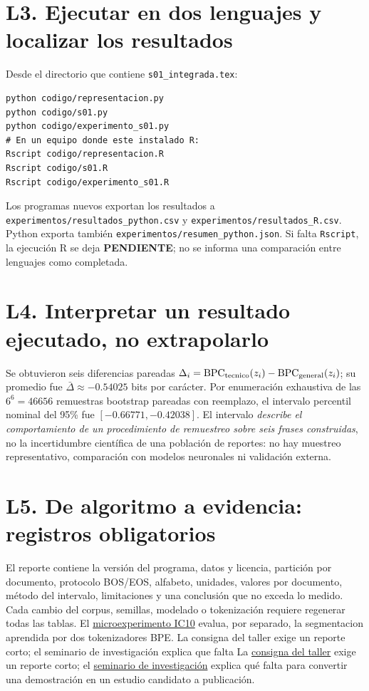 \section*{L3. Ejecutar en dos lenguajes y localizar los resultados}
Desde el directorio que contiene \texttt{s01\_integrada.tex}:
\begin{verbatim}
python codigo/representacion.py
python codigo/s01.py
python codigo/experimento_s01.py
# En un equipo donde este instalado R:
Rscript codigo/representacion.R
Rscript codigo/s01.R
Rscript codigo/experimento_s01.R
\end{verbatim}
Los programas nuevos exportan los resultados a
\nolinkurl{experimentos/resultados_python.csv} y
\nolinkurl{experimentos/resultados_R.csv}. Python exporta también
\nolinkurl{experimentos/resumen_python.json}. Si falta \texttt{Rscript},
la ejecución R se deja \textbf{PENDIENTE}; no se informa una comparación
entre lenguajes como completada.

\section*{L4. Interpretar un resultado ejecutado, no extrapolarlo}
\begin{ejemplo}
Se obtuvieron seis diferencias pareadas
$\Delta_i=\operatorname{BPC}_{\rm tecnico}(z_i)-
\operatorname{BPC}_{\rm general}(z_i)$; su promedio fue
$\bar\Delta\approx-0.54025$ bits por carácter.
Por enumeración exhaustiva de las $6^6=46656$ remuestras bootstrap
pareadas con reemplazo, el intervalo percentil nominal del 95\% fue
$[-0.66771,-0.42038]$.
El intervalo \emph{describe el comportamiento de un procedimiento de
remuestreo sobre seis frases construidas}, no la incertidumbre científica
de una población de reportes: no hay muestreo representativo, comparación
con modelos neuronales ni validación externa.
\end{ejemplo}
\section*{L5. De algoritmo a evidencia: registros obligatorios}
El reporte contiene la versión del programa, datos y licencia,
partición por documento, protocolo BOS/EOS, alfabeto, unidades,
valores por documento, método del intervalo, limitaciones y
una conclusión que no exceda lo medido. Cada cambio del corpus,
semillas, modelado o tokenización requiere regenerar todas las tablas.
El \hyperref[lab:ic10]{microexperimento IC10} evalua, por separado,
la segmentacion aprendida por dos tokenizadores BPE.
\ifdefined\labcompstandalone
La consigna del taller exige un reporte corto; el seminario de
investigación explica que falta
\else
La \hyperref[mod:taller]{consigna del taller} exige un reporte corto;
el \hyperref[mod:invest]{seminario de investigación} explica qué falta
\fi
para convertir una demostración en un estudio candidato a publicación.
